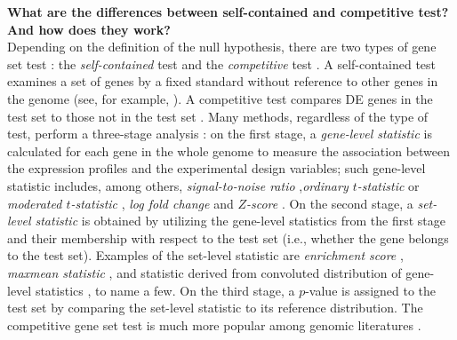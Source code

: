 \documentclass[a4,center,fleqn]{NAR}
\begin{document}
	\textbf{What are the differences between self-contained and competitive test? And how does they
		work?}\\
	Depending on the definition of the null hypothesis, there are two types of gene set test
	\citep{goeman2007analyzing}: the \textit{self-contained} test and the \textit{competitive} test . A
	self-contained test examines a set of genes by a fixed standard without reference to other genes in
	the genome (see, for example, \cite{goeman2004global,goeman2005testing, tsai2009multivariate,
		wu2010roast, huang2013gene}). A competitive test compares DE
	genes in the test set to those not in the test set \citep{tian2005discovering, wu2012camera,
		yaari2013quantitative}. Many methods, regardless of the type of test, perform a three-stage analysis
	\citep{khatri2012ten}: on the first stage, a \textit{gene-level statistic} is calculated for each
	gene in the whole genome to measure the association between the expression profiles and the
	experimental design variables; such gene-level statistic includes, among others,
	\textit{signal-to-noise ratio} \citep{subramanian2005gene},\textit{ordinary $t$-statistic}
	\citep{tian2005discovering} or \textit{moderated $t$-statistic} \citep{Smyth2004moderated},
	\textit{log fold change} \citep{kim2005page} and \textit{$Z$-score} \citep{efron2007correlation}. On
	the second stage, a \textit{set-level statistic} is obtained by utilizing the gene-level statistics
	from the first stage and their membership with respect to the test set (i.e., whether the gene
	belongs to the test set). Examples of the set-level statistic are \textit{enrichment score}
	\citep{subramanian2005gene}, \textit{maxmean statistic} \citep{efron2007testing}, and statistic
	derived from convoluted distribution of gene-level statistics \citep{yaari2013quantitative}, to name
	a few. On the third stage, a $p$-value is assigned to the test set by comparing the set-level
	statistic to its reference distribution. The competitive gene set test is much more popular among
	genomic literatures \citep{goeman2007analyzing, gatti2010heading}.  
	
	
\end{document}
